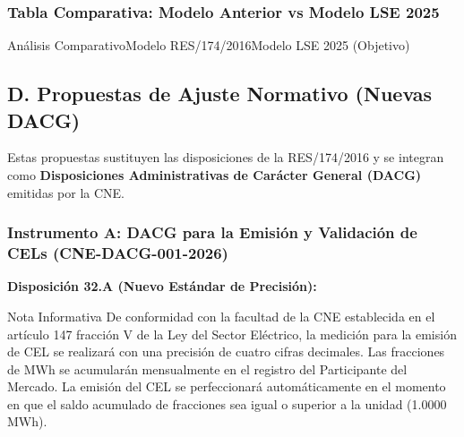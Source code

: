 \documentclass{cel}
\begin{document}
\subsubsection{Tabla Comparativa: Modelo Anterior vs Modelo LSE 2025}
\nopagebreak

\vspace{0.3cm}
\begin{tablaParadigmaV2}{Análisis Comparativo}{Modelo RES/174/2016}{Modelo LSE 2025 (Objetivo)}
\end{tablaParadigmaV2}

\subsection{D. Propuestas de Ajuste Normativo (Nuevas DACG)}
\nopagebreak

Estas propuestas sustituyen las disposiciones de la RES/174/2016 y se integran como \textbf{Disposiciones Administrativas de Carácter General (DACG)} emitidas por la CNE.


\subsubsection{Instrumento A: DACG para la Emisión y Validación de CELs (CNE-DACG-001-2026)}
\nopagebreak

\textbf{Disposición 32.A (Nuevo Estándar de Precisión):}


\vspace{0.2cm}
\begin{glowBox}[gobmxDorado]{Nota Informativa}
\textquotedbl{}De conformidad con la facultad de la CNE establecida en el artículo 147 fracción V de la Ley del Sector Eléctrico, la medición para la emisión de CEL se realizará con una precisión de cuatro cifras decimales. Las fracciones de MWh se acumularán mensualmente en el registro del Participante del Mercado. La emisión del CEL se perfeccionará automáticamente en el momento en que el saldo acumulado de fracciones sea igual o superior a la unidad (1.0000 MWh).\textquotedbl{}
\end{glowBox}
\end{document}
